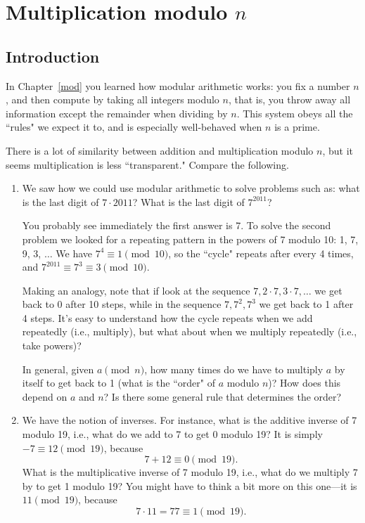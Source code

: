 \chapter{Multiplication modulo $n$}
\label{multiplicative}

\section{Introduction}
In Chapter~\ref{mod} you learned how modular arithmetic works: you fix a number $n$, and then compute by taking all integers modulo $n$, that is, you throw away all information except the remainder when dividing by $n$. This system obeys all the ``rules" we expect it to, and is especially well-behaved when $n$ is a prime.

There is a lot of similarity between addition and multiplication modulo $n$, but it seems multiplication is less ``transparent." Compare the following.
\begin{enumerate}
\item
We saw how we could use modular arithmetic to solve problems such as: what is the last digit of $7\cdot 2011$? What is the last digit of $7^{2011}$? 

You probably see immediately the first answer is 7. To solve the second problem we looked for a repeating pattern in the powers of 7 modulo 10: 1, 7, 9, 3, $\ldots$ We have $7^4\equiv 1\pmod{10}$, so the ``cycle" repeats after every 4 times, and $7^{2011}\equiv 7^3\equiv 3\pmod{10}$.

Making an analogy, note that if look at the sequence $7, 2\cdot 7, 3\cdot 7,\ldots$ we get back to 0 after 10 steps, while in the sequence $7, 7^2, 7^3$ we get back to 1 after 4 steps. It's easy to understand how the cycle repeats when we add repeatedly (i.e., multiply), but what about when we multiply repeatedly (i.e., take powers)?

In general, given $a\pmod n$, how many times do we have to multiply $a$ by itself to get back to 1 (what is the ``order" of $a$ modulo $n$)? How does this depend on $a$ and $n$? Is there some general rule that determines the order?
\item We have the notion of inverses. For instance, what is the additive inverse of 7 modulo 19, i.e., what do we add to 7 to get 0 modulo 19? It is simply $-7\equiv 12\pmod{19}$, because
\[
7+12\equiv 0\pmod{19}.
\]
What is the multiplicative inverse of 7 modulo 19, i.e., what do we multiply 7 by to get 1 modulo 19? You might have to think a bit more on this one---it is $11\pmod{19}$, because
\[
7\cdot 11= 77\equiv 1\pmod{19}.
\]
\end{enumerate}


